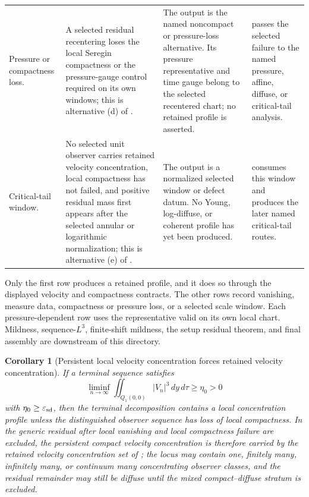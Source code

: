 \documentclass[11pt]{amsart}
\numberwithin{equation}{section}
\theoremstyle{plain}
\newtheorem{corollary}[corollary]{Corollary}
\theoremstyle{definition}
\theoremstyle{remark}
\newcommand{\eps}{\varepsilon}
\begin{document}
\begin{longtable}{@{}L{0.16\textwidth}L{0.25\textwidth}L{0.27\textwidth}L{0.24\textwidth}@{}}
Pressure or compactness loss. &
A selected residual recentering loses the local Seregin compactness or the
pressure-gauge control required on its own windows; this is alternative
\textup{(d)} of
. &
The output is the named noncompact or pressure-loss alternative.  Its pressure
representative and time gauge belong to the selected recentered chart; no
retained profile is asserted. &
 passes the selected failure
to the named pressure, affine, diffuse, or critical-tail analysis.\\

Critical-tail window. &
No selected unit observer carries retained velocity concentration, local
compactness has not failed, and positive residual mass first appears after the
selected annular or logarithmic normalization; this is alternative
\textup{(e)} of
. &
The output is a normalized selected window or defect datum.  No Young,
log-diffuse, or coherent profile has yet been produced. &
 consumes this window and
produces the later named critical-tail routes.\\
\hline
\end{longtable}
\endgroup

Only the first row produces a retained profile, and it does so through the
displayed velocity and compactness contracts.  The other rows record vanishing,
measure data, compactness or pressure loss, or a selected scale window.  Each
pressure-dependent row uses the representative valid on its own local chart.
Mildness, sequence-\(L^3\), finite-shift mildness, the setup residual theorem,
and final assembly are downstream of this directory.

\begin{corollary}[Persistent local velocity concentration forces retained velocity concentration]
\label{cor:persistent-forces-active}
If a terminal sequence satisfies
\[
   \liminf_{n\to\infty}
   \iint_{Q_1(0,0)} |V_n|^3\,dy\,d\tau\ge\eta_0>0
\]
with \(\eta_0\ge\eps_{\rm sd}\), then the terminal decomposition contains a
local concentration profile unless the distinguished observer sequence has
loss of local compactness.  In the generic residual after local vanishing and
local compactness failure are excluded, the persistent compact velocity concentration is
therefore carried by the retained velocity concentration set of
; the locus may contain one, finitely many,
infinitely many, or continuum many concentrating observer classes, and the residual
remainder may still be diffuse until the mixed compact--diffuse stratum is
excluded.
\end{corollary}
\end{document}
